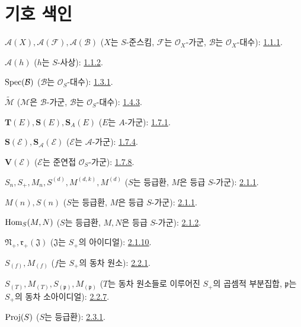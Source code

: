 \clearpage
{}
{}
\section*{기호 색인}
\thispagestyle{plain}

\begingroup
\small
\setlength{\parindent}{0pt}
\setlength{\parskip}{2pt}
\newcommand{\egaShProj}{\mathcal{P}\!\operatorname{roj}}

$\mathcal{A}(X),\mathcal{A}(\mathcal{F}),\mathcal{A}(\mathcal{B})$
($X$는 $S$-준스킴, $\mathcal{F}$는 $\mathcal{O}_X$-가군,
$\mathcal{B}$는 $\mathcal{O}_X$-대수): \hyperref[II.1.1.1-ko]{1.1.1}.

$\mathcal{A}(h)$ ($h$는 $S$-사상): \hyperref[II.1.1.2-ko]{1.1.2}.

$\operatorname{Spec}(\mathcal{B})$ ($\mathcal{B}$는 $\mathcal{O}_S$-대수): \hyperref[II.1.3.1-ko]{1.3.1}.

$\widetilde{\mathcal{M}}$ ($\mathcal{M}$은 $\mathcal{B}$-가군,
$\mathcal{B}$는 $\mathcal{O}_S$-대수): \hyperref[II.1.4.3-ko]{1.4.3}.

$\mathbf{T}(E),\mathbf{S}(E),\mathbf{S}_A(E)$ ($E$는 $A$-가군): \hyperref[II.1.7.1-ko]{1.7.1}.

$\mathbf{S}(\mathcal{E}),\mathbf{S}_{\mathcal{A}}(\mathcal{E})$
($\mathcal{E}$는 $\mathcal{A}$-가군): \hyperref[II.1.7.4-ko]{1.7.4}.

$\mathbf{V}(\mathcal{E})$ ($\mathcal{E}$는 준연접 $\mathcal{O}_S$-가군): \hyperref[II.1.7.8-ko]{1.7.8}.

$S_n,S_+,M_n,S^{(d)},M^{(d,k)},M^{(d)}$
($S$는 등급환, $M$은 등급 $S$-가군): \hyperref[II.2.1.1-ko]{2.1.1}.

$M(n),S(n)$ ($S$는 등급환, $M$은 등급 $S$-가군): \hyperref[II.2.1.1-ko]{2.1.1}.

$\operatorname{Hom}_S(M,N)$ ($S$는 등급환, $M,N$은 등급 $S$-가군): \hyperref[II.2.1.2-ko]{2.1.2}.

$\mathfrak N_+,\mathfrak r_+(\mathfrak J)$
($\mathfrak J$는 $S_+$의 아이디얼): \hyperref[II.2.1.10-ko]{2.1.10}.

$S_{(f)},M_{(f)}$ ($f$는 $S_+$의 동차 원소): \hyperref[II.2.2.1-ko]{2.2.1}.

$S_{(T)},M_{(T)},S_{(\mathfrak p)},M_{(\mathfrak p)}$
($T$는 동차 원소들로 이루어진 $S_+$의 곱셈적 부분집합,
$\mathfrak p$는 $S_+$의 동차 소아이디얼): \hyperref[II.2.2.7-ko]{2.2.7}.

$\operatorname{Proj}(S)$ ($S$는 등급환): \hyperref[II.2.3.1-ko]{2.3.1}.

